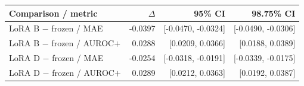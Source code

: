 
{\small\setlength{\tabcolsep}{4pt}
\begin{tabularx}{\textwidth}{Xrrr}
\toprule
Comparison / metric & $\Delta$ & 95\% CI & 98.75\% CI \\
\midrule
LoRA B $-$ frozen / MAE & -0.0397 & [-0.0470, -0.0324] & [-0.0490, -0.0306] \\
LoRA B $-$ frozen / AUROC$+$ & 0.0288 & [0.0209, 0.0366] & [0.0188, 0.0389] \\
LoRA D $-$ frozen / MAE & -0.0254 & [-0.0318, -0.0191] & [-0.0339, -0.0175] \\
LoRA D $-$ frozen / AUROC$+$ & 0.0289 & [0.0212, 0.0363] & [0.0192, 0.0387] \\
\bottomrule
\end{tabularx}}
